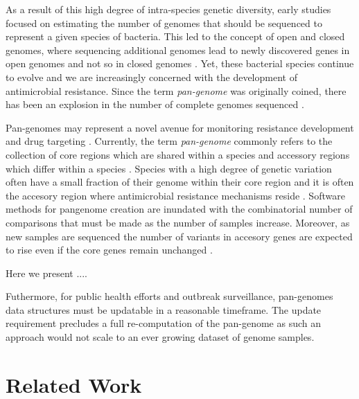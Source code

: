 \documentclass{article}
\begin{document}
As a result of this high degree of intra-species genetic diversity, early studies \cite{tettelin2005genome, tettelin2008comparative} focused on estimating the number of genomes that should be sequenced to represent a given species of bacteria.
This led to the concept of open and closed genomes, where sequencing additional genomes lead to newly discovered genes in open genomes and not so in closed genomes \cite{tettelin2008comparative}.
Yet, these bacterial species continue to evolve and we are increasingly concerned with the development of antimicrobial resistance.
Since the term \textit{pan-genome} was originally coined, there has been an explosion in the number of complete genomes sequenced \cite{vernikos2015ten}.


Pan-genomes may represent a novel avenue for monitoring resistance development \cite{tettelin2005genome} and drug targeting \cite{muzzi2007pan}.
Currently, the term \textit{pan-genome} commonly refers to the collection of core regions which are shared within a species and accessory regions which differ within a species \cite{tettelin2005genome, vernikos2015ten}.
Species with a high degree of genetic variation often have a small fraction of their genome within their core region \cite{rouli2015bacterial} and it is often the accesory region where antimicrobial resistance mechanisms reside \cite{muzzi2007pan}.
Software methods for pangenome creation are inundated with the combinatorial number of comparisons that must be made as the number of samples increase.
Moreover, as new samples are sequenced the number of variants in accesory genes are expected to rise even if the core genes remain unchanged \cite{medini2005microbial}.

Here we present ....

Futhermore, for public health efforts and outbreak surveillance, pan-genomes data structures must be updatable in a reasonable timeframe.
The update requirement precludes a full re-computation of the pan-genome as such an approach would not scale to an ever growing dataset of genome samples.

\enlargethispage{-65.1pt}

\section{Related Work}
\end{document}
